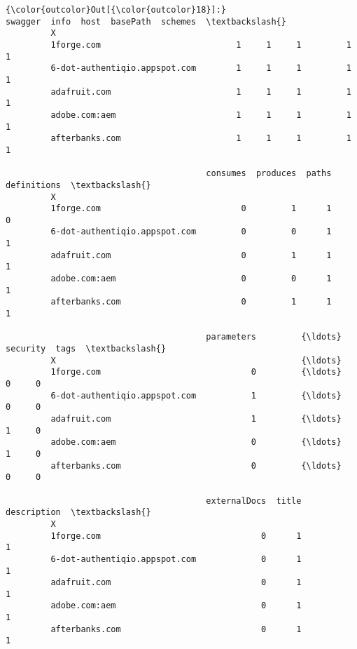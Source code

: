 \documentclass[11pt]{article}
\begin{document}
\begin{Verbatim}[commandchars=\\\{\}]
{\color{outcolor}Out[{\color{outcolor}18}]:}                                swagger  info  host  basePath  schemes  \textbackslash{}
         X                                                                       
         1forge.com                           1     1     1         1        1   
         6-dot-authentiqio.appspot.com        1     1     1         1        1   
         adafruit.com                         1     1     1         1        1   
         adobe.com:aem                        1     1     1         1        1   
         afterbanks.com                       1     1     1         1        1   
         
                                        consumes  produces  paths  definitions  \textbackslash{}
         X                                                                       
         1forge.com                            0         1      1            0   
         6-dot-authentiqio.appspot.com         0         0      1            1   
         adafruit.com                          0         1      1            1   
         adobe.com:aem                         0         0      1            1   
         afterbanks.com                        0         1      1            1   
         
                                        parameters         {\ldots}          security  tags  \textbackslash{}
         X                                                 {\ldots}                           
         1forge.com                              0         {\ldots}                 0     0   
         6-dot-authentiqio.appspot.com           1         {\ldots}                 0     0   
         adafruit.com                            1         {\ldots}                 1     0   
         adobe.com:aem                           0         {\ldots}                 1     0   
         afterbanks.com                          0         {\ldots}                 0     0   
         
                                        externalDocs  title  description  \textbackslash{}
         X                                                                 
         1forge.com                                0      1            1   
         6-dot-authentiqio.appspot.com             0      1            1   
         adafruit.com                              0      1            1   
         adobe.com:aem                             0      1            1   
         afterbanks.com                            0      1            1   
         

\end{Verbatim}
\end{document}
